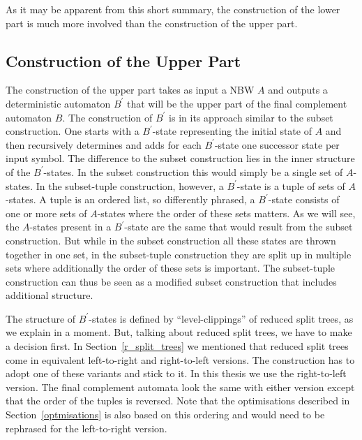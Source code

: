 \documentclass[a4paper]{report}
\begin{document}
As it may be apparent from this short summary, the construction of the lower part is much more involved than the construction of the upper part.

\subsection{Construction of the Upper Part}
The construction of the upper part takes as input a NBW $A$ and outputs a deterministic automaton $B^\prime$ that will be the upper part of the final complement automaton $B$. The construction of $B^\prime$ is in its approach similar to the subset construction. One starts with a $B^\prime$-state representing the initial state of $A$ and then recursively determines and adds for each $B^\prime$-state one successor state per input symbol. The difference to the subset construction lies in the inner structure of the $B^\prime$-states. In the subset construction this would simply be a single set of $A$-states. In the subset-tuple construction, however, a $B^\prime$-state is a tuple of sets of $A$-states. A tuple is an ordered list, so differently phrased, a $B^\prime$-state consists of one or more sets of $A$-states where the order of these sets matters. As we will see, the $A$-states present in a $B^\prime$-state are the same that would result from the subset construction. But while in the subset construction all these states are thrown together in one set, in the subset-tuple construction they are split up in multiple sets where additionally the order of these sets is important. The subset-tuple construction can thus be seen as a modified subset construction that includes additional structure.

The structure of $B^\prime$-states is defined by ``level-clippings'' of reduced split trees, as we explain in a moment. But, talking about reduced split trees, we have to make a decision first. In Section~\ref{r_split_trees} we mentioned that reduced split trees come in equivalent left-to-right and right-to-left versions. The construction has to adopt one of these variants and stick to it. In this thesis we use the right-to-left version. The final complement automata look the same with either version except that the order of the tuples is reversed. Note that the optimisations described in Section~\ref{optmisations} is also based on this ordering and would need to be rephrased for the left-to-right version.
\end{document}
